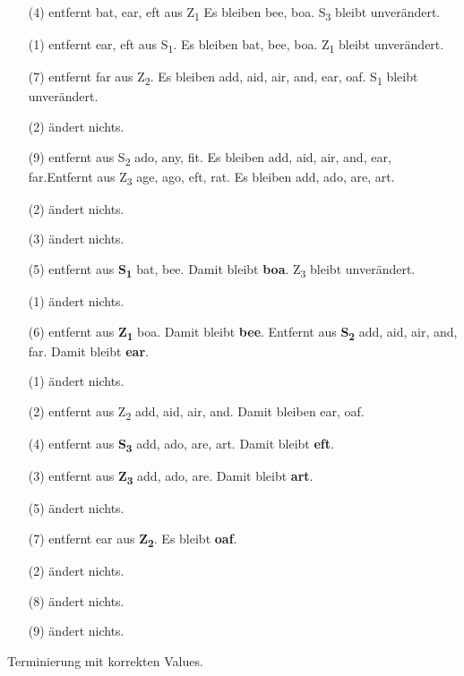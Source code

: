 \documentclass[ngerman]{fbi-aufgabenblatt}
\begin{document}
\begin{itemize}
	\item[(4)] entfernt bat, ear, eft aus Z\textsubscript{1} Es bleiben bee, boa. S\textsubscript{3} bleibt unverändert.
	\item[(1)] entfernt ear, eft aus S\textsubscript{1}. Es bleiben bat, bee, boa. Z\textsubscript{1} bleibt unverändert.
	\item[(7)] entfernt far aus Z\textsubscript{2}. Es bleiben add, aid, air, and, ear, oaf. S\textsubscript{1} bleibt unverändert.
	\item[(2)] ändert nichts.
	\item[(9)] entfernt aus S\textsubscript{2} ado, any, fit. Es bleiben add, aid, air, and, ear, far.Entfernt aus Z\textsubscript{3} age, ago, eft, rat. Es bleiben add, ado, are, art.
	\item[(2)] ändert nichts.
	\item[(3)] ändert nichts.
	\item[(5)] entfernt aus \textbf{S\textsubscript{1}} bat, bee. Damit bleibt \textbf{boa}. Z\textsubscript{3} bleibt unverändert.
	\item[(1)] ändert nichts.
	\item[(6)] entfernt aus \textbf{Z\textsubscript{1}} boa. Damit bleibt \textbf{bee}. Entfernt aus \textbf{S\textsubscript{2}} add, aid, air, and, far. Damit bleibt \textbf{ear}.
	\item[(1)] ändert nichts.
	\item[(2)] entfernt aus Z\textsubscript{2} add, aid, air, and. Damit bleiben ear, oaf.
	\item[(4)] entfernt aus \textbf{S\textsubscript{3}} add, ado, are, art. Damit bleibt \textbf{eft}.
	\item[(3)] entfernt aus \textbf{Z\textsubscript{3}} add, ado, are. Damit bleibt \textbf{art}.
	\item[(5)] ändert nichts.
	\item[(7)] entfernt ear aus \textbf{Z\textsubscript{2}}. Es bleibt \textbf{oaf}.
	\item[(2)] ändert nichts.
	\item[(8)] ändert nichts.
	\item[(9)] ändert nichts.
\end{itemize}
Terminierung mit korrekten Values.
\end{document}
